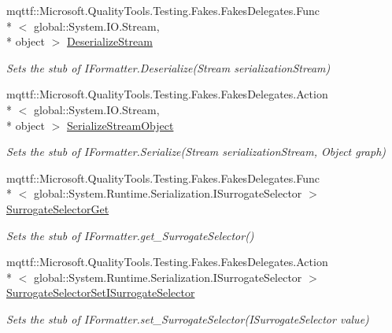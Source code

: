 \begin{DoxyCompactItemize}
mqttf\-::\-Microsoft.\-Quality\-Tools.\-Testing.\-Fakes.\-Fakes\-Delegates.\-Func\\*
$<$ global\-::\-System.\-I\-O.\-Stream, \\*
object $>$ \hyperlink{class_system_1_1_runtime_1_1_serialization_1_1_fakes_1_1_stub_i_formatter_ae2015e5bbf150aa04a84bc172277d5d4}{Deserialize\-Stream}
\begin{DoxyCompactList}\small\item\em Sets the stub of I\-Formatter.\-Deserialize(\-Stream serialization\-Stream)\end{DoxyCompactList}\item 
mqttf\-::\-Microsoft.\-Quality\-Tools.\-Testing.\-Fakes.\-Fakes\-Delegates.\-Action\\*
$<$ global\-::\-System.\-I\-O.\-Stream, \\*
object $>$ \hyperlink{class_system_1_1_runtime_1_1_serialization_1_1_fakes_1_1_stub_i_formatter_afcc2fc1ab7abba7e6a6f84c1251ab9b5}{Serialize\-Stream\-Object}
\begin{DoxyCompactList}\small\item\em Sets the stub of I\-Formatter.\-Serialize(\-Stream serialization\-Stream, Object graph)\end{DoxyCompactList}\item 
mqttf\-::\-Microsoft.\-Quality\-Tools.\-Testing.\-Fakes.\-Fakes\-Delegates.\-Func\\*
$<$ global\-::\-System.\-Runtime.\-Serialization.\-I\-Surrogate\-Selector $>$ \hyperlink{class_system_1_1_runtime_1_1_serialization_1_1_fakes_1_1_stub_i_formatter_abadc38b385e19d6f9456e9570ffc6d67}{Surrogate\-Selector\-Get}
\begin{DoxyCompactList}\small\item\em Sets the stub of I\-Formatter.\-get\-\_\-\-Surrogate\-Selector()\end{DoxyCompactList}\item 
mqttf\-::\-Microsoft.\-Quality\-Tools.\-Testing.\-Fakes.\-Fakes\-Delegates.\-Action\\*
$<$ global\-::\-System.\-Runtime.\-Serialization.\-I\-Surrogate\-Selector $>$ \hyperlink{class_system_1_1_runtime_1_1_serialization_1_1_fakes_1_1_stub_i_formatter_a7080f9eaf6b3bee6ac91ce8d952af498}{Surrogate\-Selector\-Set\-I\-Surrogate\-Selector}
\begin{DoxyCompactList}\small\item\em Sets the stub of I\-Formatter.\-set\-\_\-\-Surrogate\-Selector(\-I\-Surrogate\-Selector value)\end{DoxyCompactList}\end{DoxyCompactItemize}


